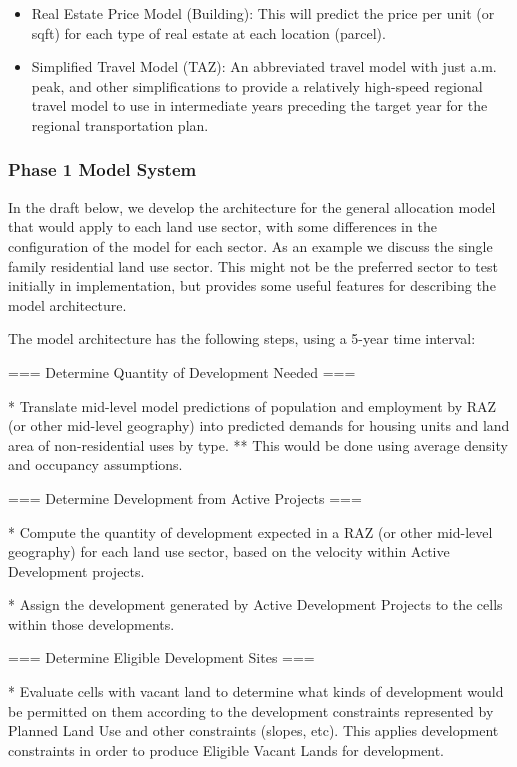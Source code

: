 \begin{itemize}
\begin{itemize}
\item Real Estate Price Model (Building): This will predict the price per unit (or sqft) for each type of real estate at each location (parcel).
\item Simplified Travel Model (TAZ): An abbreviated travel model with just a.m. peak, and other simplifications to provide a relatively high-speed regional travel model to use in intermediate years preceding the target year for the regional transportation plan.
\end{itemize}
\end{itemize}


\subsubsection{Phase 1 Model System}
In the draft below, we develop the architecture for the general allocation model that would apply to each land use sector, with some differences in the configuration of the model for each sector.  As an example we discuss the single family residential land use sector.  This might not be the preferred sector to test initially in implementation, but provides some useful features for describing the model architecture.

The model architecture has the following steps, using a 5-year time interval:

=== Determine Quantity of Development Needed ===

* Translate mid-level model predictions of population and employment by RAZ (or other mid-level geography) into predicted demands for housing units and land area of non-residential uses by type.
** This would be done using average density and occupancy assumptions.

=== Determine Development from Active Projects ===

* Compute the quantity of development expected in a RAZ (or other mid-level geography) for each land use sector, based on the velocity within Active Development projects.

* Assign the development generated by Active Development Projects to the cells within those developments.  

=== Determine Eligible Development Sites ===

* Evaluate cells with vacant land to determine what kinds of development would be permitted on them according to the development constraints represented by Planned Land Use and other constraints (slopes, etc).  This applies development constraints in order to produce Eligible Vacant Lands for development.

